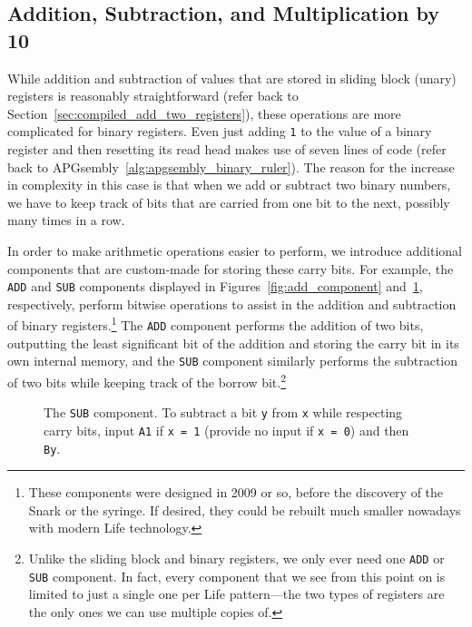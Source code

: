 \subsection{Addition, Subtraction, and Multiplication by 10}\label{sec:add_sub_and_mult10}

While addition and subtraction of values that are stored in sliding block (unary) registers is reasonably straightforward (refer back to Section~\ref{sec:compiled_add_two_registers}), these operations are more complicated for binary registers. Even just adding \texttt{1} to the value of a binary register and then resetting its read head makes use of seven lines of code (refer back to APGsembly~\ref{alg:apgsembly_binary_ruler}). The reason for the increase in complexity in this case is that when we add or subtract two binary numbers, we have to keep track of bits that are carried from one bit to the next, possibly many times in a row.

In order to make arithmetic operations easier to perform, we introduce additional components that are custom-made for storing these carry bits. For example, the \texttt{ADD} and \texttt{SUB} components displayed in Figures~\ref{fig:add_component} and~\ref{fig:sub_component}, respectively, perform bitwise operations to assist in the addition and subtraction of binary registers.\footnote{These components were designed in 2009 or so, before the discovery of the Snark or the syringe. If desired, they could be rebuilt much smaller nowadays with modern Life technology.} The \texttt{ADD} component performs the addition of two bits, outputting the least significant bit of the addition and storing the carry bit in its own internal memory, and the \texttt{SUB} component similarly performs the subtraction of two bits while keeping track of the borrow bit.\footnote{Unlike the sliding block and binary registers, we only ever need one \texttt{ADD} or \texttt{SUB} component. In fact, every component that we see from this point on is limited to just a single one per Life pattern---the two types of registers are the only ones we can use multiple copies of.}

\begin{figure}[!htb]
	\centering
	\begin{minipage}[t]{0.48\textwidth}
		\centering
		\caption{The \texttt{ADD} component. To add up two bits \texttt{x} and \texttt{y} while respecting carry bits, input \texttt{A1} if \texttt{x = 1} (provide no input if \texttt{x = 0}) and then \texttt{By}.}\label{fig:add_component}
	\end{minipage}\hfill
	\begin{minipage}[t]{0.48\textwidth}
		\centering
		\caption{The \texttt{SUB} component. To subtract a bit \texttt{y} from \texttt{x} while respecting carry bits, input \texttt{A1} if \texttt{x = 1} (provide no input if \texttt{x = 0}) and then \texttt{By}.}\label{fig:sub_component}
	\end{minipage}
\end{figure}

